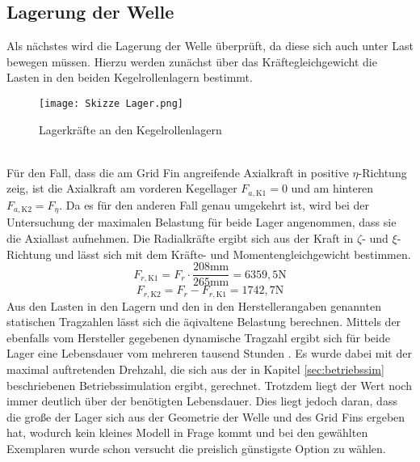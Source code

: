 \subsection{Lagerung der Welle}
Als nächstes wird die Lagerung der Welle überprüft, da diese sich auch unter Last bewegen müssen. Hierzu werden zunächst über das Kräftegleichgewicht die Lasten in den beiden Kegelrollenlagern bestimmt.
\begin{figure}[h] 
	\centering
	\texttt{[image: Skizze Lager.png]}
	\caption{Lagerkräfte an den Kegelrollenlagern}
\end{figure}\\
Für den Fall, dass die am Grid Fin angreifende Axialkraft in positive $\eta$-Richtung zeig, ist die Axialkraft am vorderen Kegellager $F_{a, \mathrm{K1}} = 0$ und am hinteren $F_{a, \mathrm{K2}} = F_\eta$. Da es für den anderen Fall genau umgekehrt ist, wird bei der Untersuchung der maximalen Belastung für beide Lager angenommen, dass sie die Axiallast aufnehmen. Die Radialkräfte ergibt sich aus der Kraft in $\zeta$- und $\xi$-Richtung und lässt sich mit dem Kräfte- und Momentengleichgewicht bestimmen.
\begin{equation}
	F_{r, \mathrm{K1}} = F_r\cdot\frac{208\mathrm{mm}}{265\mathrm{mm}}=6359,5\mathrm{N}
\end{equation}
\begin{equation}
	F_{r, \mathrm{K2}} = F_r-F_{r, \mathrm{K1}}=1742,7\mathrm{N}
\end{equation}
Aus den Lasten in den Lagern und den in den Herstellerangaben genannten statischen Tragzahlen lässt sich die äqivaltene Belastung berechnen. Mittels der ebenfalls vom Hersteller gegebenen dynamische Tragzahl ergibt sich für beide Lager eine Lebensdauer vom mehreren tausend Stunden \cite{metall}. Es wurde dabei mit der maximal auftretenden Drehzahl, die sich aus der in Kapitel \ref{sec:betriebssim} beschriebenen Betriebssimulation ergibt, gerechnet. Trotzdem liegt der Wert noch immer deutlich über der benötigten Lebensdauer. Dies liegt jedoch daran, dass die große der Lager sich aus der Geometrie der Welle und des Grid Fins ergeben hat, wodurch kein kleines Modell in Frage kommt und bei den gewählten Exemplaren wurde schon versucht die preislich günstigste Option zu wählen.
